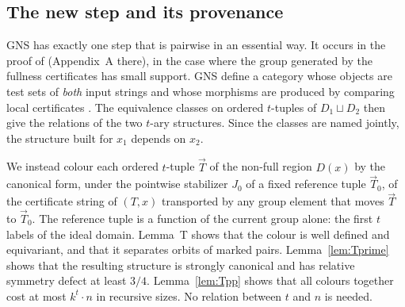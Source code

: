 \documentclass[11pt]{article}
\theoremstyle{plain}
\theoremstyle{definition}
\theoremstyle{remark}
\theoremstyle{named}
\theoremstyle{namedrm}
\newcommand{\vT}{\vec{T}}
\begin{document}
\subsection{The new step and its provenance}\label{sec:device}

GNS has exactly one step that is pairwise in an essential way. It occurs in the proof of
\cite[Lemma~6.6]{GNS} (Appendix~A there), in the case where the group generated by the fullness
certificates has small support. GNS define a category whose objects are test sets of \emph{both} input
strings and whose morphisms are produced by comparing local certificates \cite[Lemma~6.3]{GNS}. The
equivalence classes on ordered $t$-tuples of $D_1\sqcup D_2$ then give the relations of the two $t$-ary
structures. Since the classes are named jointly, the structure built for $x_1$ depends on $x_2$.

We instead colour each ordered $t$-tuple $\vT$ of the non-full region $D(x)$ by the canonical form,
under the pointwise stabilizer $J_0$ of a fixed reference tuple $\vT_0$, of the certificate string of
$(T,x)$ transported by any group element that moves $\vT$ to $\vT_0$. The reference tuple is a function
of the current group alone: the first $t$ labels of the ideal domain. Lemma~T shows that the
colour is well defined and equivariant, and that it separates orbits of marked pairs.
Lemma~\ref{lem:Tprime} shows that the resulting structure is strongly canonical and has relative
symmetry defect at least $3/4$. Lemma~\ref{lem:Tpp} shows that all colours together cost at most
$k^t\cdot n$ in recursive sizes. No relation between $t$ and $n$ is needed.
\end{document}
